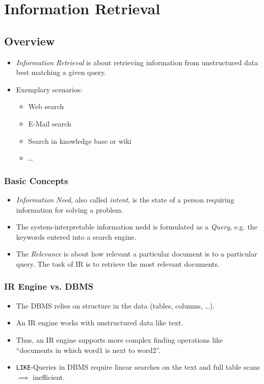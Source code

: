 \documentclass[a4paper, 11pt, accentcolor = tud3b]{tudreport}
\begin{document}
    \chapter{Information Retrieval} %
        \section{Overview} %
            \begin{itemize}
            	\item \textit{Information Retrieval} is about retrieving information from unstructured data best matching a given query.
            	\item Exemplary scenarios:
            		\begin{itemize}
            			\item Web search
            			\item E-Mail search
            			\item Search in knowledge base or wiki
            			\item \dots
            		\end{itemize}
            \end{itemize}

            \subsection{Basic Concepts} %
                \begin{itemize}
                	\item \textit{Information Need}, also called \textit{intent}, is the state of a person requiring information for solving a problem.
                	\item The system-interpretable information nedd is formulated as a \textit{Query}, e.g. the keywords entered into a search engine.
                	\item The \textit{Relevance} is about how relevant a particular document is to a particular query. The task of IR is to retrieve the most relevant documents.
                \end{itemize}

            \subsection{IR Engine vs. DBMS} %
                \begin{itemize}
                	\item The DBMS relies on structure in the data (tables, columns, \dots).
                	\item An IR engine works with unstructured data like text.
                	\item Thus, an IR engine supports more complex finding operations like \enquote{documents in which word1 is next to word2}.
                	\item \lstinline|LIKE|-Queries in DBMS require linear searches on the text and full table scans \(\implies\) inefficient.
                \end{itemize}
\end{document}
